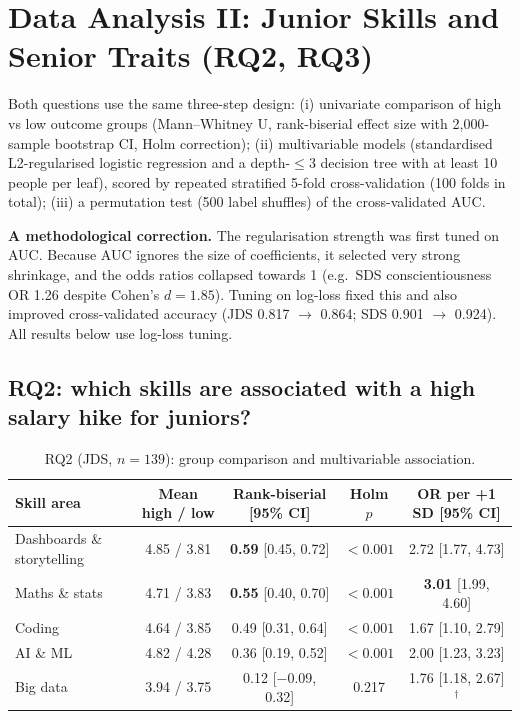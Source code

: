 \section{Data Analysis II: Junior Skills and Senior Traits (RQ2, RQ3)}\label{sec:rq23}

Both questions use the same three-step design: (i) univariate comparison of high vs low outcome
groups (Mann--Whitney U, rank-biserial effect size with 2,000-sample bootstrap CI, Holm
correction); (ii) multivariable models (standardised L2-regularised logistic regression and a
depth-$\leq 3$ decision tree with at least 10 people per leaf), scored by repeated stratified
5-fold cross-validation (100 folds in total); (iii) a permutation test (500 label shuffles) of the
cross-validated AUC.

\textbf{A methodological correction.} The regularisation strength was first tuned on AUC. Because
AUC ignores the size of coefficients, it selected very strong shrinkage, and the odds ratios
collapsed towards 1 (e.g.\ SDS conscientiousness OR 1.26 despite Cohen's $d = 1.85$). Tuning on
log-loss fixed this and also improved cross-validated accuracy (JDS 0.817 $\rightarrow$ 0.864;
SDS 0.901 $\rightarrow$ 0.924). All results below use log-loss tuning.

\subsection{RQ2: which skills are associated with a high salary hike for juniors?}

\begin{table}[H]\centering\small
\caption{RQ2 (JDS, $n=139$): group comparison and multivariable association.}\label{tab:rq2}
\begin{tabular}{@{}l c c c c@{}}
\toprule
Skill area & Mean high / low & Rank-biserial [95\% CI] & Holm $p$ & OR per +1 SD [95\% CI]\\
\midrule
Dashboards \& storytelling & 4.85 / 3.81 & \textbf{0.59} [0.45, 0.72] & $<0.001$ & 2.72 [1.77, 4.73]\\
Maths \& stats & 4.71 / 3.83 & \textbf{0.55} [0.40, 0.70] & $<0.001$ & \textbf{3.01} [1.99, 4.60]\\
Coding & 4.64 / 3.85 & 0.49 [0.31, 0.64] & $<0.001$ & 1.67 [1.10, 2.79]\\
AI \& ML & 4.82 / 4.28 & 0.36 [0.19, 0.52] & $<0.001$ & 2.00 [1.23, 3.23]\\
Big data & 3.94 / 3.75 & 0.12 [$-$0.09, 0.32] & 0.217 & 1.76 [1.18, 2.67]$^\dagger$\\
\bottomrule
\end{tabular}
\end{table}

